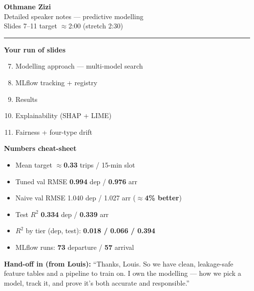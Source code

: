 \documentclass[11pt]{article}
\newcommand{\Rtwo}{$R^2$}
\newcommand{\approxx}{$\approx$}
\begin{document}
\begin{center}
\vspace*{0.3cm}
{\color{blue}\Huge\bfseries Othmane Zizi}\\[6pt]
{\color{slate}\Large Detailed speaker notes --- predictive modelling}\\[4pt]
{\color{slate}\large Slides 7--11 \;\textbar\; target \approxx 2:00 (stretch 2:30)}\\[10pt]
\rule{0.6\linewidth}{1pt}
\end{center}

\noindent
\begin{minipage}[t]{0.5\linewidth}
\textbf{Your run of slides}
\begin{enumerate}[leftmargin=1.4em, itemsep=1pt]
  \setcounter{enumi}{6}
  \item Modelling approach --- multi-model search
  \item MLflow tracking + registry
  \item Results
  \item Explainability (SHAP + LIME)
  \item Fairness + four-type drift
\end{enumerate}
\end{minipage}\hfill
\begin{minipage}[t]{0.46\linewidth}
\textbf{Numbers cheat-sheet}
\begin{itemize}[leftmargin=1.2em]
  \item Mean target \approxx \textbf{0.33} trips / 15-min slot
  \item Tuned val RMSE \textbf{0.994} dep / \textbf{0.976} arr
  \item Naive val RMSE 1.040 dep / 1.027 arr (\textbf{\approxx 4\% better})
  \item Test \Rtwo{} \textbf{0.334} dep / \textbf{0.339} arr
  \item \Rtwo{} by tier (dep, test): \textbf{0.018 / 0.066 / 0.394}
  \item MLflow runs: \textbf{73} departure / \textbf{57} arrival
\end{itemize}
\end{minipage}

\medskip
\begin{say}
\textbf{Hand-off in (from Louis):} ``Thanks, Louis. So we have clean, leakage-safe feature tables and a
pipeline to train on. I own the modelling --- how we pick a model, track it, and prove it's both
accurate and responsible.''
\end{say}
\end{document}
